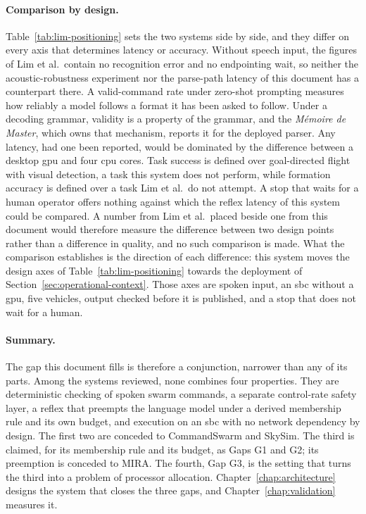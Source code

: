 \paragraph{Comparison by design.} Table~\ref{tab:lim-positioning} sets the two systems side by side,
and they differ on every axis that determines latency or accuracy. Without speech input, the figures
of Lim et al.\ contain no recognition error and no endpointing wait, so neither the
acoustic-robustness experiment nor the parse-path latency of this document has a counterpart there.
A valid-command rate under zero-shot prompting measures how reliably a model follows a format it has
been asked to follow. Under a decoding grammar, validity is a property of the grammar, and the
\emph{M\'emoire de Master}, which owns that mechanism, reports it for the deployed parser. Any
latency, had one been reported, would be dominated by the difference between a desktop \gls{gpu} and
four \gls{cpu} cores. Task success is defined over goal-directed flight with visual detection, a
task this system does not perform, while formation accuracy is defined over a task Lim et al.\ do
not attempt. A stop that waits for a human operator offers nothing against which the reflex latency
of this system could be compared. A number from Lim et al.\ placed beside one from this document
would therefore measure the difference between two design points rather than a difference in
quality, and no such comparison is made. What the comparison establishes is the direction of each
difference: this system moves the design axes of Table~\ref{tab:lim-positioning} towards the
deployment of Section~\ref{sec:operational-context}. Those axes are spoken input, an \gls{sbc}
without a \gls{gpu}, five vehicles, output checked before it is published, and a stop that does not
wait for a human.

\paragraph{Summary.} The gap this document fills is therefore a conjunction, narrower than any of
its parts. Among the systems reviewed, none combines four properties. They are deterministic
checking of spoken swarm commands, a separate control-rate safety layer, a reflex that preempts the
language model under a derived membership rule and its own budget, and execution on an \gls{sbc}
with no network dependency by design. The first two are conceded to CommandSwarm and SkySim. The
third is claimed, for its membership rule and its budget, as Gaps G1 and G2; its preemption is
conceded to MIRA. The fourth, Gap G3, is the setting that turns the third into a problem of
processor allocation. Chapter~\ref{chap:architecture} designs the system that closes the three gaps,
and Chapter~\ref{chap:validation} measures it.
